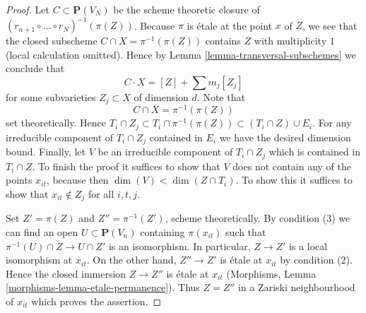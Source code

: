 \documentclass[10pt,a4paper]{amsart}
\theoremstyle{plain}
\theoremstyle{definition}
\theoremstyle{remark}
\numberwithin{equation}{subsection}
\begin{document}
\begin{proof}
\medskip\noindent
Let $C \subset \mathbf{P}(V_N)$ be the scheme theoretic closure of
$(r_{n + 1} \circ \ldots \circ r_N)^{-1}(\pi(Z))$. Because $\pi$
is \'etale at the point $x$ of $Z$, we see that the closed subscheme
$C \cap X = \pi^{-1}(\pi(Z))$
contains $Z$ with multiplicity $1$ (local calculation omitted).
Hence by Lemma \ref{lemma-transversal-subschemes} we conclude that
$$
C \cdot X = [Z] + \sum m_j[Z_j]
$$
for some subvarieties $Z_j \subset X$ of dimension $d$. Note that
$$
C \cap X = \pi^{-1}(\pi(Z))
$$
set theoretically. Hence
$T_i \cap Z_j \subset T_i \cap \pi^{-1}(\pi(Z)) \subset (T_i \cap Z) \cup E_i$.
For any irreducible component of $T_i \cap Z_j$ contained in $E_i$ we
have the desired dimension bound. Finally, let $V$ be an irreducible
component of $T_i \cap Z_j$ which is contained in $T_i \cap Z$. To finish
the proof it suffices to show that $V$ does not contain any of the
points $x_{it}$, because then $\dim(V) < \dim(Z \cap T_i)$.
To show this it suffices to show that $x_{it} \not \in Z_j$
for all $i, t, j$.

\medskip\noindent
Set $Z' = \pi(Z)$ and $Z'' = \pi^{-1}(Z')$, scheme theoretically. By
condition (3) we can find an open $U \subset \mathbf{P}(V_n)$ containing
$\pi(x_{it})$ such that $\pi^{-1}(U) \cap Z \to U \cap Z'$ is an isomorphism.
In particular, $Z \to Z'$ is a local isomorphism at $x_{it}$.
On the other hand, $Z'' \to Z'$ is \'etale at $x_{it}$ by condition (2).
Hence the closed immersion $Z \to Z''$ is \'etale at $x_{it}$
(Morphisms, Lemma \ref{morphisms-lemma-etale-permanence}).
Thus $Z = Z''$ in a Zariski neighbourhood of $x_{it}$ which proves
the assertion.
\end{proof}
\end{document}
